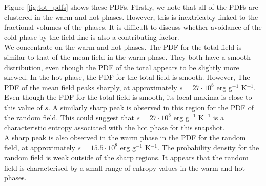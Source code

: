 \documentclass[useAMS,usenatbib]{mn2e}
\begin{document}

Figure \vref{fig:tot_pdfs} shows these PDFs. FIrstly, we note that all of the PDFs are clustered in the warm and hot phases. However, this is inextricably linked to the fractional volumes of the phases. It is difficult to discuss whether avoidance of the cold phase by the field line is also a contributing factor.\\
We concentrate on the warm and hot phases. The PDF for the total field is similar to that of the mean field in the warm phase. They both have a smooth distribution, even though the PDF of the total appears to be slightly more skewed. In the hot phase, the PDF for the total field is smooth. However, The PDF of the mean field peaks sharply, at approximately $s=27\cdot10^8$ erg g$^{-1}$ K$^{-1}$. Even though the PDF for the total field is smooth, its local maxima is close to this value of $s$. A similarly sharp peak is observed in this region for the PDF of the random field. This could suggest that $s=27\cdot10^8$ erg g$^{-1}$ K$^{-1}$ is a characteristic entropy associated with the hot phase for this snapshot. \\
A sharp peak is also observed in the warm phase in the PDF for the random field, at approximately $s=15.5\cdot10^8$ erg g$^{-1}$ K$^{-1}$. The probability density for the random field is weak outside of the sharp regions. It appears that the random field is characterised by a small range of entropy values in the warm and hot phases. 

\end{document}

